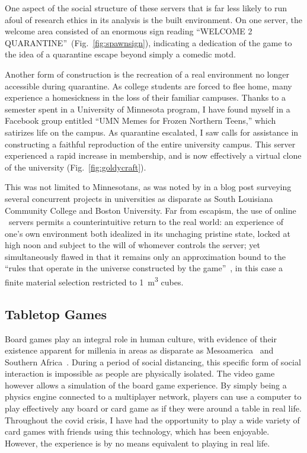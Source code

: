 \documentclass[russian,american]{../../../coursework}
\newcommand{\mc}{\citetitle{Minecraft}}
\newcommand{\tbl}{\citetitle{Tabletop}}
\begin{document}
One aspect of the social structure of these servers that is far less likely to
run afoul of research ethics in its analysis is the built environment. On one server,
the welcome area consisted of an enormous sign reading
\enquote{WELCOME 2 QUARANTINE}~(Fig.~\ref{fig:spawnsign}), indicating a dedication of
the game to the idea of a quarantine escape beyond simply a comedic \ac{motd}.

Another form of construction is the recreation of a real environment no longer
accessible during quarantine.
As college students are forced to flee home, many experience a
homesickness in the loss of their familiar campuses. Thanks to a semester spent
in a University of Minnesota program, I have found myself in a Facebook group
entitled \enquote{UMN Memes for Frozen Northern Teens,} which satirizes life
on the campus. As quarantine escalated, I saw calls for assistance in constructing
a faithful reproduction of the entire university campus. This server experienced a rapid
increase in membership, and is now effectively a virtual clone of the university (Fig.~\ref{fig:goldycraft}).

This was not limited to Minnesotans, as was noted by \textcite{Anderson2020} in a
blog post surveying several concurrent projects in universities as disparate as South Louisiana
Community College and Boston University. Far from escapism, the use of online \mc\ servers
permits a counterintuitive return to the real world: an experience of one's own
environment both idealized in its unchaging pristine state, locked at high noon and 
subject to the will of whomever controls the server; yet simultaneously flawed
in that it remains only an approximation bound to the
\enquote{rules that operate in the universe constructed by the game}~\parencite[222]{Manovich2001},
in this case a finite material selection restricted to \SI{1}{\cubic\metre} cubes.

\subsection{Tabletop Games}

Board games play an integral role in human culture, with evidence of their
existence apparent for millenia in areas as disparate as Mesoamerica~\parencite{Voorhies2013}
and Southern Africa~\parencite{Townshend1979}. During a period of social distancing,
this specific form of social interaction is impossible as people are physically isolated.
The video game \tbl~\parencite{Tabletop} however allows a simulation of the board game
experience. By simply being a physics engine connected to a multiplayer network, players
can use a computer to play effectively any board or card game as if they were around
a table in real life. Throughout the \ac{covid} crisis, I have had the opportunity to
play a wide variety of card games with friends using this technology, which has been
enjoyable. However, the experience is by no means equivalent to playing in real life.
\end{document}
